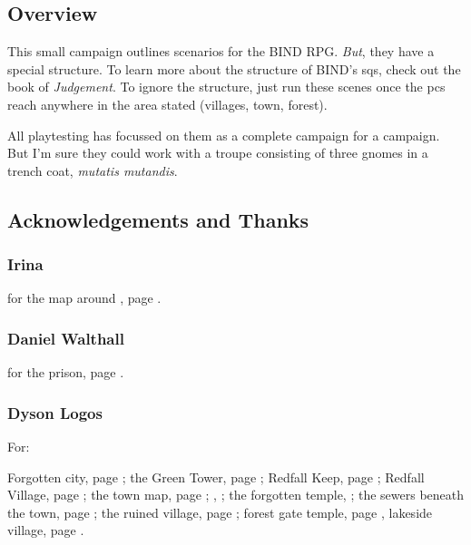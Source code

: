 \begin{multicols}{2}

\subsection*{Overview}

This small campaign outlines scenarios for the BIND RPG.
\emph{But}, they have a special structure.
To learn more about the structure of BIND's \glspl{sq}, check out the book of \textit{Judgement}\iftoggle{judgement}{, \autopageref{sidequests}}{}.
To ignore the structure, just run these scenes once the \glspl{pc} reach anywhere in the area stated (villages, town, forest).

\noindent
All playtesting has focussed on them as a complete campaign for a  campaign.
But I'm sure they could work with a troupe consisting of three gnomes in a trench coat, \textit{mutatis mutandis}.

\subsection*{Acknowledgements and Thanks}

\subsubsection{Irina}
for the map around , page \pageref{Irina/greylands}.

\subsubsection{Daniel Walthall}
for the prison, page \pageref{Daniel_Walthall/prison}.

\subsubsection{Dyson Logos}

For:

Forgotten city, page \pageref{Dyson_Logos/forgotten_city};
the Green Tower, page \pageref{Dyson_Logos/green_tower};
Redfall Keep, page \pageref{Dyson_Logos/redfall_keep};
Redfall Village, page \pageref{Dyson_Logos/redfall};
the town map, page \pageref{Dyson_Logos/town};
, \pageref{Dyson_Logos/mincing_pig};
the forgotten temple, \pageref{Dyson_Logos/qualme_temple};
the sewers beneath the town, page \pageref{Dyson_Logos/sewer};
the ruined village, page \pageref{Dyson_Logos/ruined_village};
forest gate temple, page \pageref{Dyson_Logos/shadow_gate},
lakeside village, page \pageref{Dyson_Logos/lakeside}.


\end{multicols}
